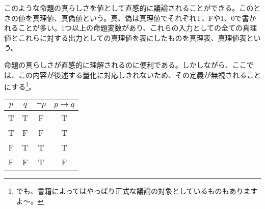 \documentclass[a4paper]{jsarticle}
\begin{document}
\begin{dfn}\label{dfn1.1.1.5}
このような命題の真らしさを値として直感的に議論されることができる。このときの値を真理値、真偽値という。真、偽は真理値でそれぞれT、Fや1、0で書かれることが多い。1つ以上の命題変数があり、これらの入力としての全ての真理値とこれらに対する出力としての真理値を表にしたものを真理表、真理値表という。
\end{dfn}
命題の真らしさが直感的に理解されるのに便利である。しかしながら、ここでは、この内容が後述する量化に対応しきれないため、その定義が無視されることにする\footnote{でも、書籍によってはやっぱり正式な議論の対象としているものもありますよ～。}。
\begin{longtable}[c]{cccc}
\hline
$p$ & $q$ & $\neg p$ & $p\rightarrow q$ \\
\hline \hline
T & T & F & T \\
T & F & F & T \\
F & T & T & T \\
F & F & T & F \\
\hline
\end{longtable}
\end{document}
